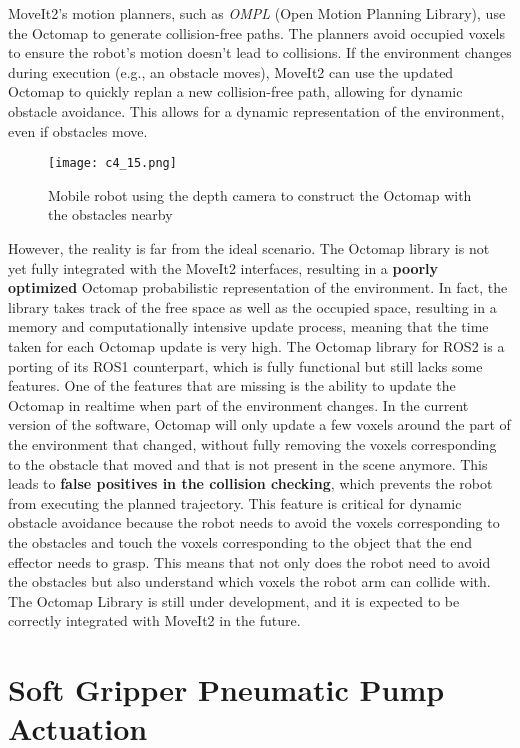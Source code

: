 MoveIt2's motion planners, such as \textit{OMPL} (Open Motion Planning Library), use the Octomap
to generate collision-free paths. The planners avoid occupied voxels to ensure the robot's motion doesn't lead to collisions.
If the environment changes during execution (e.g., an obstacle moves), MoveIt2 can use the updated Octomap 
to quickly replan a new collision-free path, allowing for dynamic obstacle avoidance.
This allows for a dynamic representation of the environment, even if obstacles move.

\begin{figure}[t]
    \centering
    \texttt{[image: c4\_15.png]}
    \caption{Mobile robot using the depth camera to construct the Octomap with the obstacles nearby}
    \label{fig:octomap}
\end{figure}

However, the reality is far from the ideal scenario. The Octomap library is not yet fully integrated with the MoveIt2
interfaces, resulting in a \textbf{poorly optimized} Octomap probabilistic representation of the environment.
In fact, the library takes track of the free space as well as the occupied space, resulting in a memory and computationally
intensive update process, meaning that the time taken for each Octomap update is very high. The Octomap
library for ROS2 is a porting of its ROS1 counterpart, which is fully functional but still lacks some features.
One of the features that are missing is the ability to update the Octomap in realtime when part of the
environment changes. In the current version of the software, Octomap will only update a few voxels around the
part of the environment that changed, without fully removing the voxels corresponding to the obstacle that moved
and that is not present in the scene anymore. This leads to \textbf{false positives in the collision checking}, which
prevents the robot from executing the planned trajectory. This feature is critical for dynamic obstacle avoidance
because the robot needs to avoid the voxels corresponding to the obstacles and touch the voxels corresponding
to the object that the end effector needs to grasp. This means that not only does the robot need to avoid the obstacles
but also understand which voxels the robot arm can collide with.
The Octomap Library is still under development, and it is expected to be correctly integrated with MoveIt2 in the future.

\section{Soft Gripper Pneumatic Pump Actuation}


